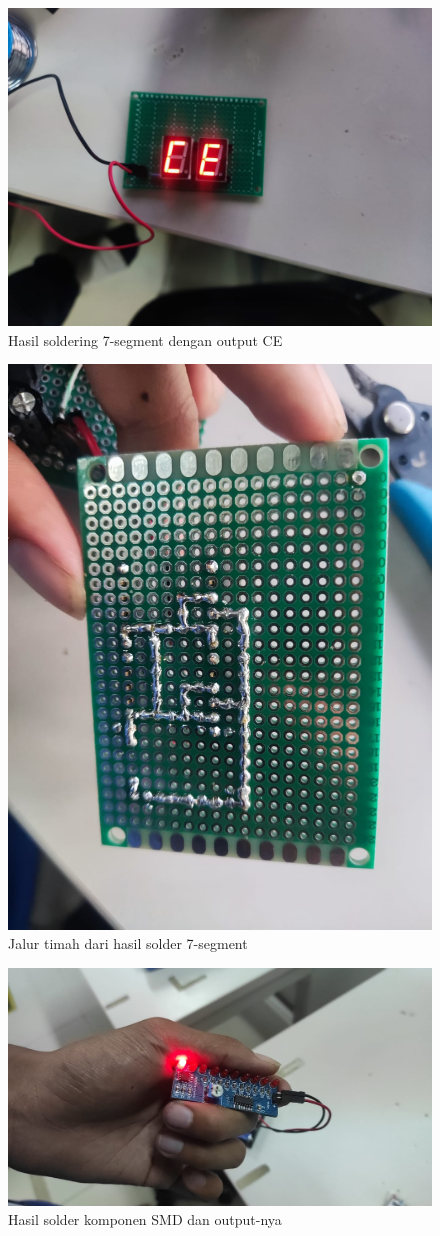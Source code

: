 \begin{figure}[h]
  \centering
  \includegraphics[width=0.8\linewidth]{img/ce-result.jpeg}
  \caption{Hasil soldering 7-segment dengan output CE} 
  \label{fig:ce-result}
\end{figure}

\begin{figure}[h]
  \centering
  \includegraphics[width=0.6\linewidth]{img/cd-result-back.jpeg}
  \caption{Jalur timah dari hasil solder 7-segment} 
  \label{fig:ce-result-back}
\end{figure}

\begin{figure}[h]
  \centering
  \includegraphics[width=0.6\linewidth]{img/smd-front.jpeg}
  \caption{Hasil solder komponen SMD dan output-nya} 
  \label{fig:smd-front}
\end{figure}


